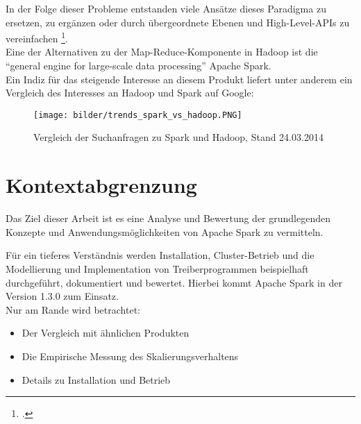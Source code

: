 In der Folge dieser Probleme entstanden viele Ansätze dieses Paradigma zu ersetzen, zu ergänzen oder durch übergeordnete Ebenen und High-Level-APIs zu vereinfachen \footcite{Sin14}.\\

Eine der Alternativen zu der Map-Reduce-Komponente in Hadoop ist die "`general engine for large-scale data processing"' Apache Spark.\\

Ein Indiz für das steigende Interesse an diesem Produkt liefert unter anderem ein Vergleich des Interesses an Hadoop und Spark auf Google:\\

\begin{figure}[h]
\texttt{[image: bilder/trends\_spark\_vs\_hadoop.PNG]}
\caption[Google Trends]{Vergleich der Suchanfragen zu Spark und Hadoop, Stand 24.03.2014 \cite{googletrends}}
\end{figure}

\section{Kontextabgrenzung}
Das Ziel dieser Arbeit ist es eine Analyse und Bewertung der grundlegenden Konzepte und Anwendungsmöglichkeiten von Apache Spark zu vermitteln.

Für ein tieferes Verständnis werden Installation, Cluster-Betrieb und die Modellierung und Implementation von Treiberprogrammen beispielhaft durchgeführt, dokumentiert und bewertet. Hierbei kommt Apache Spark in der Version 1.3.0 zum Einsatz.\\

Nur am Rande wird betrachtet:
\begin{itemize}
	\item Der Vergleich mit ähnlichen Produkten
	\item Die Empirische Messung des Skalierungsverhaltens
	\item Details zu Installation und Betrieb
\end{itemize}
